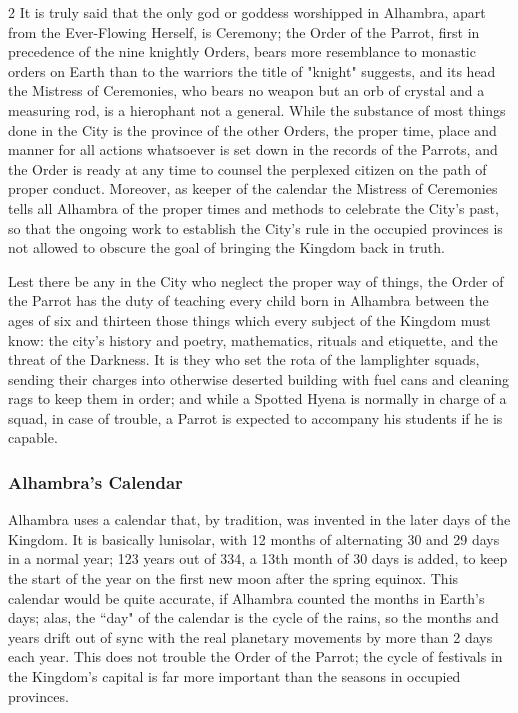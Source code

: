 \begin{multicols}{2}
It is truly said that the only god or goddess worshipped in Alhambra, apart from the Ever-Flowing Herself, is Ceremony; the Order of the Parrot, first in precedence of the nine knightly Orders, bears more resemblance to monastic orders on Earth than to the warriors the title of "knight" suggests, and its head the Mistress of Ceremonies, who bears no weapon but an orb of crystal and a measuring rod, is a hierophant not a general. While the substance of most things done in the City is the province of the other Orders, the proper time, place and manner for all actions whatsoever is set down in the records of the Parrots, and the Order is ready at any time to counsel the perplexed citizen on the path of proper conduct. Moreover, as keeper of the calendar the Mistress of Ceremonies tells all Alhambra of the proper times and methods to celebrate the City's past, so that the ongoing work to establish the City's rule in the occupied provinces is not allowed to obscure the goal of bringing the Kingdom back in truth.

Lest there be any in the City who neglect the proper way of things, the Order of the Parrot has the duty of teaching every child born in Alhambra between the ages of six and thirteen those things which every subject of the Kingdom must know: the city's history and poetry, mathematics, rituals and etiquette, and the threat of the Darkness. It is they who set the rota of the lamplighter squads, sending their charges into otherwise deserted building with fuel cans and cleaning rags to keep them in order; and while a Spotted Hyena is normally in charge of a squad, in case of trouble, a Parrot is expected to accompany his students if he is capable. 

\subsubsection*{Alhambra's Calendar}

Alhambra uses a calendar that, by tradition, was invented in the later days of the Kingdom. It is basically lunisolar, with 12 months of alternating 30 and 29 days in a normal year; 123 years out of 334, a 13th month of 30 days is added, to keep the start of the year on the first new moon after the spring equinox. This calendar would be quite accurate, if Alhambra counted the months in Earth's days; alas, the \textquotedblleft day" of the calendar is the cycle of the rains, so the months and years drift out of sync with the real planetary movements by more than 2 days each year. This does not trouble the Order of the Parrot; the cycle of festivals in the Kingdom's capital is far more important than the seasons in occupied provinces.


\end{multicols}
